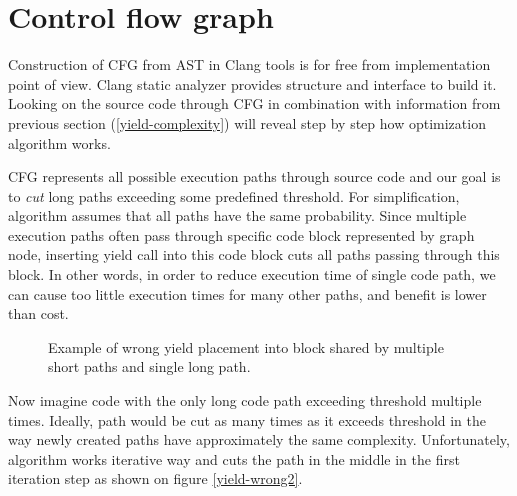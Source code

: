 \section{Control flow graph}
Construction of CFG from AST in Clang tools is for free from implementation point of view. Clang static analyzer provides structure and interface to build it. Looking on the source code through CFG in combination with information from previous section (\ref{yield-complexity}) will reveal step by step how optimization algorithm works.

CFG represents all possible execution paths through source code and our goal is to \textit{cut} long paths exceeding some predefined threshold. For simplification, algorithm assumes that all paths have the same probability. Since multiple execution paths often pass through specific code block represented by graph node, inserting yield call into this code block cuts all paths passing through this block. In other words, in order to reduce execution time of single code path, we can cause too little execution times for many other paths, and benefit is lower than cost. 

\begin{figure}[h!]
\caption{Example of wrong yield placement into block shared by multiple short paths and single long path.}
\label{yield-wrong1}
\centering
\vspace{0.5cm}
\end{figure}

Now imagine code with the only long code path exceeding threshold multiple times. Ideally, path would be cut as many times as it exceeds threshold in the way newly created paths have approximately the same complexity. Unfortunately, algorithm works iterative way and cuts the path in the middle in the first iteration step as shown on figure \ref{yield-wrong2}.

